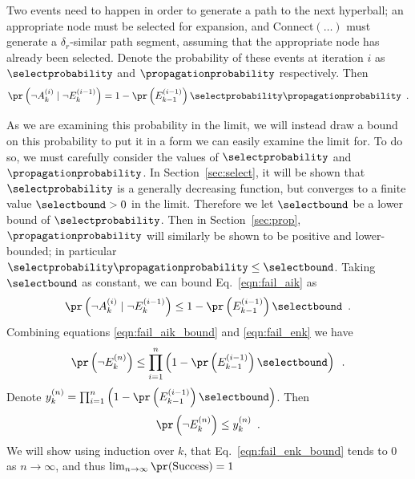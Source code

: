 Two events need to happen in order to generate a path to the next hyperball; an appropriate node must be selected for expansion, and Connect$(\dots)$ must generate a $\delta_r$-similar path segment, assuming that the appropriate node has already been selected. Denote the probability of these events at iteration $i$ as $\selectprobability$ and $\propagationprobability$ respectively. Then
\begin{equation}
    \pr\left( \neg A^{(i)}_k \mid \neg E^{(i-1)}_k \right) = 1 - \pr\left( E^{(i-1)}_{k-1} \right) \selectprobability \propagationprobability \enspace .
    \label{eqn:fail_aik}
\end{equation}

\noindent
As we are examining this probability in the limit, we will instead draw a bound on this probability to put it in a form we can easily examine the limit for. To do so, we must carefully consider the values of $\selectprobability$ and $\propagationprobability$.  In Section~\ref{sec:select}, it will be shown that $\selectprobability$ is a generally decreasing function, but converges to a finite value $\selectbound > 0$ in the limit.  Therefore we let $\selectbound$ be a lower bound of $\selectprobability$.  Then in Section~\ref{sec:prop}, $\propagationprobability$ will similarly be shown to be positive and lower-bounded; in particular $\selectprobability \propagationprobability \leq \selectbound$.  Taking $\selectbound$ as constant, we can bound Eq.~\eqref{eqn:fail_aik} as
\begin{equation}
    \pr\left( \neg A^{(i)}_k \mid \neg E^{(i-1)}_k \right) \leq 1 - \pr\left( E^{(i-1)}_{k-1} \right) \selectbound \enspace .
    \label{eqn:fail_aik_bound}
\end{equation}
Combining equations \eqref{eqn:fail_aik_bound} and \eqref{eqn:fail_enk} we have
\begin{equation}
    \pr\left( \neg E^{(n)}_k \right) \leq \prod_{i=1}^n \left(1 - \pr\left( E^{(i-1)}_{k-1} \right) \selectbound \right) \enspace .
\end{equation}
Denote $y^{(n)}_k = \prod_{i=1}^n \left(1 - \pr\left( E^{(i-1)}_{k-1} \right) \selectbound \right)$. Then
\begin{equation}
    \pr\left( \neg E^{(n)}_k \right) \leq y^{(n)}_k \enspace .
    \label{eqn:fail_enk_bound}
\end{equation}
We will show using induction over $k$, that Eq.~\eqref{eqn:fail_enk_bound} tends to 0 as $n \rightarrow \infty$, and thus $\lim_{n \rightarrow \infty} \pr(\textrm{Success}) = 1$\\

